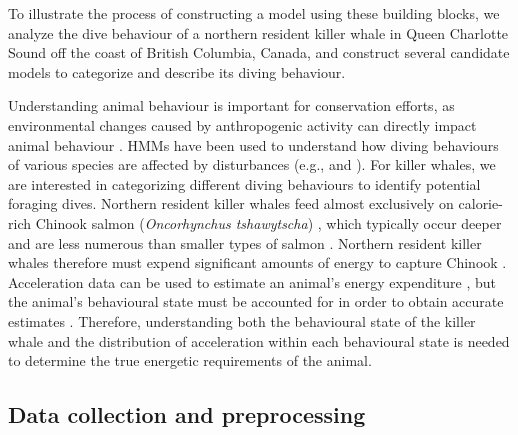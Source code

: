 

To illustrate the process of constructing a model using these building blocks, we analyze the dive behaviour of a northern resident killer whale in Queen Charlotte Sound off the coast of British Columbia, Canada, and construct several candidate models to categorize and describe its diving behaviour.

Understanding animal behaviour is important for conservation efforts, as environmental changes caused by anthropogenic activity can directly impact animal behaviour \citep{Sutherland:1998}. HMMs have been used to understand how diving behaviours of various species are affected by disturbances (e.g., \citet{DeRuiter:2017} and \citet{Isojunno:2017}). For killer whales, we are interested in categorizing different diving behaviours to identify potential foraging dives. Northern resident killer whales feed almost exclusively on calorie-rich Chinook salmon (\textit{Oncorhynchus tshawytscha}) \citep{Ford:2006}, which typically occur deeper and are less numerous than smaller types of salmon \citep{Ford:2009}. Northern resident killer whales therefore must expend significant amounts of energy to capture Chinook \citep{Williams:2009,Noren:2011,Wright:2017}. 
Acceleration data can be used to estimate an animal's energy expenditure \citep{Green:2009,Wilson:2019}, but the animal's behavioural state must be accounted for in order to obtain accurate estimates \citep{Dot:2016}. Therefore, understanding both the behavioural state of the killer whale and the distribution of acceleration within each behavioural state is needed to determine the true energetic requirements of the animal.

\subsection{Data collection and preprocessing}

